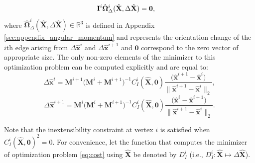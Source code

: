 \begin{thm}
\begin{align}
    \mathbf{I}^i   \hat{\boldsymbol{\Omega}}^i_\Delta (\hat{\mathbf{X}},\Delta \hat{\mathbf{X}} ) = \mathbf{0}, & \notag
\end{align}
where $\hat{\boldsymbol{\Omega}}^i_\Delta (\hat{\mathbf{X}},\Delta \hat{\mathbf{X}} ) \in \mathbb{R}^{3}$ is defined in Appendix \ref{sec:appendix_angular_momentum} and represents the orientation change of the $i$th edge arising from $\Delta \hat{\mathbf{x}}^i$ and $\Delta \hat{\mathbf{x}}^{i+1}$ and $\mathbf{0}$ correspond to the zero vector of appropriate size. 
The only non-zero elements of the minimizer to this optimization problem can be computed explicitly and are equal to:
\begin{equation}
    \label{eq:momentum_solution1_inext} 
    \Delta \hat{\mathbf{x}}^i 
    =
    \mathbf{M}^{i+1}\bigl(\mathbf{M}^i + \mathbf{M}^{i+1}\bigr)^{-1}
    C^i_{I}(\hat{\mathbf{X}}, \mathbf{0}) 
    \frac{ \bigl(\hat{\mathbf{x}}^{i+1} - \hat{\mathbf{x}}^{i}\bigr)
         }{\|\hat{\mathbf{x}}^{i+1} - \hat{\mathbf{x}}^{i}\|_2},
\end{equation}
\begin{equation}
    \label{eq:momentum_solution2_inext} 
    \Delta \hat{\mathbf{x}}^{i+1} 
    =
    \mathbf{M}^i(\mathbf{M}^i + \mathbf{M}^{i+1}\bigr)^{-1}  
       C^i_{I}(\hat{\mathbf{X}}, \mathbf{0})
    \frac{ \bigl(\hat{\mathbf{x}}^{i} - \hat{\mathbf{x}}^{i+1}\bigr)
         }{\|\hat{\mathbf{x}}^{i+1} - \hat{\mathbf{x}}^{i}\|_2}.
\end{equation}
\end{thm}
\noindent Note that the inextensibility constraint at vertex $i$ is satisfied when $C^i_{I}(\hat{\mathbf{X}}, \mathbf{0})^2 = 0$. 
For convenience, let the function that computes the minimizer of optimization problem \eqref{eq:cost} using $\hat{\mathbf{X}}$ be denoted by $D^i_I$ (i.e., $D^i_I: \hat{\mathbf{X}} \mapsto \Delta \hat{\mathbf{X}}$). 

